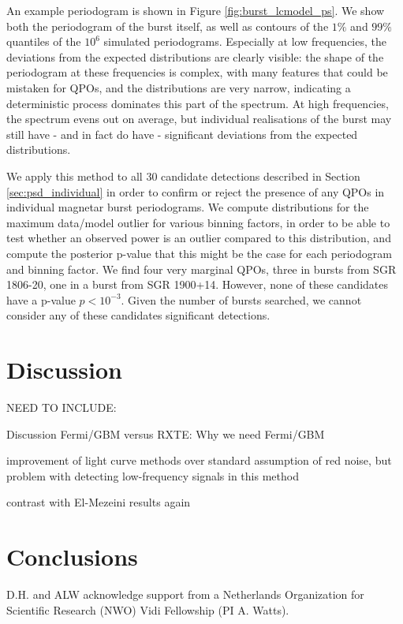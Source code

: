 \documentclass[numberedappendix]{emulateapj}
\begin{document}
An example periodogram is shown in Figure \ref{fig:burst_lcmodel_ps}. We show both the periodogram of the burst itself, as well as contours of the $1\%$ and $99\%$ quantiles of the $10^6$ simulated periodograms. Especially at low frequencies, the deviations from the expected distributions are clearly visible: the shape of the periodogram at these frequencies is complex, with many features that could be mistaken for QPOs, and the distributions are very narrow, indicating a deterministic process dominates this part of the spectrum. At high frequencies, the spectrum evens out on average, but individual realisations of the burst may still have - and in fact do have - significant deviations from the expected distributions.

We apply this method to all $30$ candidate detections described in Section \ref{sec:psd_individual} in order to confirm or reject the presence of any QPOs in individual magnetar burst periodograms. We compute distributions for the maximum data/model outlier for various binning factors, in order to be able to test whether an observed power is an outlier compared to this distribution, and compute the posterior p-value that this might be the case for each periodogram and binning factor. 
We find four very marginal QPOs, three in bursts from SGR 1806-20, one in a burst from SGR 1900+14. However, none of these candidates have a p-value $p < 10^{-3}$. Given the number of bursts searched, we cannot consider any of these candidates significant detections.



\section{Discussion}
\label{sec:discussion}

NEED TO INCLUDE:

Discussion Fermi/GBM versus RXTE: Why we need Fermi/GBM


improvement of light curve methods over standard assumption of red noise, but problem with detecting low-frequency signals in this method


 contrast with El-Mezeini results again

\section{Conclusions}


\acknowledgments
D.H. and ALW acknowledge support from a Netherlands Organization for Scientific Research (NWO) Vidi Fellowship (PI A. Watts).  




\end{document}
